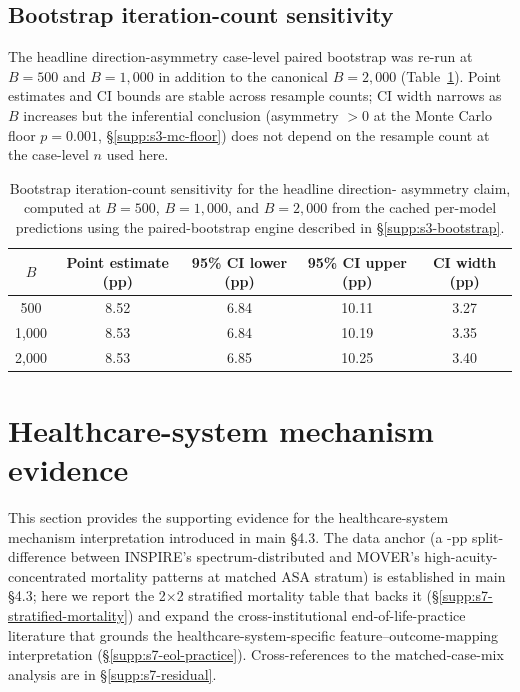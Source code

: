 \documentclass[11pt,a4paper]{article}
\begin{document}
\subsection{Bootstrap iteration-count sensitivity}\label{supp:s6-bootstrap-sensitivity}

The headline direction-asymmetry case-level paired bootstrap was re-run at
$B = 500$ and $B = 1{,}000$ in addition to the canonical $B = 2{,}000$
(Table~\ref{tab:s6-iteration-sweep}). Point estimates and CI bounds are
stable across resample counts; CI width narrows as $B$ increases but the
inferential conclusion (asymmetry $> 0$ at the Monte Carlo floor
$p = 0.001$, \S\ref{supp:s3-mc-floor}) does not depend on the resample
count at the case-level $n$ used here.

\begin{table}[H]
\centering
\caption{Bootstrap iteration-count sensitivity for the headline direction-
asymmetry claim, computed at $B = 500$, $B = 1{,}000$, and $B = 2{,}000$ from
the cached per-model predictions using the paired-bootstrap engine
described in \S\ref{supp:s3-bootstrap}.}
\label{tab:s6-iteration-sweep}
\setlength{\tabcolsep}{6pt}
\small
\begin{tabular}{ccccc}
\toprule
\textbf{$B$} & \textbf{Point estimate (pp)} & \textbf{95\% CI lower (pp)} & \textbf{95\% CI upper (pp)} & \textbf{CI width (pp)} \\
\midrule
500    & 8.52 & 6.84 & 10.11 & 3.27 \\
1{,}000 & 8.53 & 6.84 & 10.19 & 3.35 \\
2{,}000 & 8.53 & 6.85 & 10.25 & 3.40 \\
\bottomrule
\end{tabular}
\end{table}


\section{Healthcare-system mechanism evidence}\label{supp:s7-mechanism-evidence}

This section provides the supporting evidence for the healthcare-system
mechanism interpretation introduced in main \S4.3. The data anchor (a
\pnMortalitySplitDifferencePp-pp split-difference between INSPIRE's
spectrum-distributed and MOVER's high-acuity-concentrated mortality
patterns at matched ASA stratum) is established in main \S4.3; here we
report the 2$\times$2 stratified mortality table that backs it
(\S\ref{supp:s7-stratified-mortality}) and expand the cross-institutional
end-of-life-practice literature that grounds the
healthcare-system-specific feature--outcome-mapping interpretation
(\S\ref{supp:s7-eol-practice}). Cross-references to the matched-case-mix
analysis are in \S\ref{supp:s7-residual}.
\end{document}
